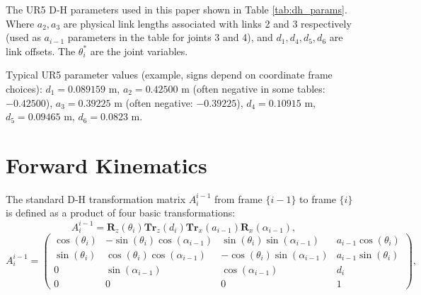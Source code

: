 \documentclass{article}
\newcommand{\mat}[1]{\begin{pmatrix} #1 \end{pmatrix}}
\newcommand{\RotX}[1]{\mathbf{R}_x(#1)}
\newcommand{\RotZ}[1]{\mathbf{R}_z(#1)}
\newcommand{\TransX}[1]{\mathbf{Tr}_x(#1)}
\newcommand{\TransZ}[1]{\mathbf{Tr}_z(#1)}
\newcommand{\sa}[1]{\sin(\alpha_{#1})} %
\newcommand{\ca}[1]{\cos(\alpha_{#1})} %
\newcommand{\st}[1]{\sin(\theta_{#1})}
\newcommand{\ct}[1]{\cos(\theta_{#1})}
\begin{document}
The UR5 D-H parameters used in this paper shown in Table \ref{tab:dh_params}. Where $a_2, a_3$ are physical link lengths associated with links 2 and 3 respectively (used as $a_{i-1}$ parameters in the table for joints 3 and 4), and $d_1, d_4, d_5, d_6$ are link offsets. The $\theta_i^*$ are the joint variables.

\begin{table}[t]
    \centering
    \renewcommand\arraystretch{1.25}
    \renewcommand\tabcolsep{7pt}
    \belowrulesep=0pt\aboverulesep=0pt
    \caption{Parameter settings of Robotic arm UR5 D-H. The specific action depends on 6 frames.}
    \label{tab:dh_params}
\end{table}

Typical UR5 parameter values (example, signs depend on coordinate frame choices):
$d_1 = 0.089159$ m, $a_2 = 0.42500$ m (often negative in some tables: $-0.42500$), $a_3 = 0.39225$ m (often negative: $-0.39225$), $d_4 = 0.10915$ m, $d_5 = 0.09465$ m, $d_6 = 0.0823$ m.

\section{Forward Kinematics}
The standard D-H transformation matrix $A_i^{i-1}$ from frame $\{i-1\}$ to frame $\{i\}$ is defined as a product of four basic transformations:
\begin{equation}
A_i^{i-1} = \RotZ{\theta_i} \TransZ{d_i} \TransX{a_{i-1}} \RotX{\alpha_{i-1}},
\end{equation}
\begin{equation}
A_i^{i-1} = \mat{\ct{i} & -\st{i}\ca{i-1} & \st{i}\sa{i-1} & a_{i-1}\ct{i} \\
                  \st{i} & \ct{i}\ca{i-1} & -\ct{i}\sa{i-1} & a_{i-1}\st{i} \\
                  0       & \sa{i-1}        & \ca{i-1}        & d_i \\
                  0       & 0               & 0               & 1 },
\end{equation}                  
\end{document}
